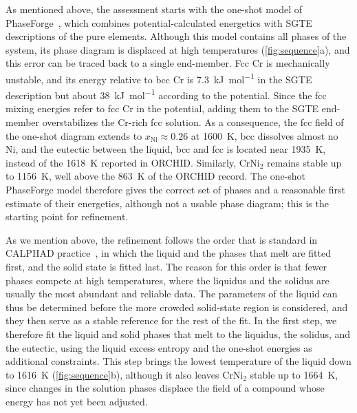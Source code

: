 As mentioned above, the assessment starts with the one-shot model of PhaseForge~\cite{zhu2025accelerating,zhu2025machinelearningpotentialsalloys}, which combines potential-calculated energetics with SGTE descriptions of the pure elements. Although this model contains all phases of the system, its phase diagram is displaced at high temperatures (\cref{fig:sequence}a), and this error can be traced back to a single end-member. Fcc Cr is mechanically unstable, and its energy relative to bcc Cr is \qty{7.3}{\kilo\joule\per\mole} in the SGTE description but about \qty{38}{\kilo\joule\per\mole} according to the potential. Since the fcc mixing energies refer to fcc Cr in the potential, adding them to the SGTE end-member overstabilizes the Cr-rich fcc solution. As a consequence, the fcc field of the one-shot diagram extends to $x_{\mathrm{Ni}} \approx 0.26$ at \qty{1600}{\K}, bcc dissolves almost no Ni, and the eutectic between the liquid, bcc and fcc is located near \qty{1935}{\K}, instead of the \qty{1618}{\K} reported in ORCHID. Similarly, CrNi$_2$ remains stable up to \qty{1156}{\K}, well above the \qty{863}{\K} of the ORCHID record. The one-shot PhaseForge model therefore gives the correct set of phases and a reasonable first estimate of their energetics, although not a usable phase diagram; this is the starting point for refinement.

As we mention above, the refinement follows the order that is standard in CALPHAD practice~\cite{lukas2007}, in which the liquid and the phases that melt are fitted first, and the solid state is fitted last. The reason for this order is that fewer phases compete at high temperatures, where the liquidus and the solidus are usually the most abundant and reliable data. The parameters of the liquid can thus be determined before the more crowded solid-state region is considered, and they then serve as a stable reference for the rest of the fit. In the first step, we therefore fit the liquid and solid phases that melt to the liquidus, the solidus, and the eutectic, using the liquid excess entropy and the one-shot energies as additional constraints. This step brings the lowest temperature of the liquid down to \qty{1616}{\K} (\cref{fig:sequence}b), although it also leaves CrNi$_2$ stable up to \qty{1664}{\K}, since changes in the solution phases displace the field of a compound whose energy has not yet been adjusted.

